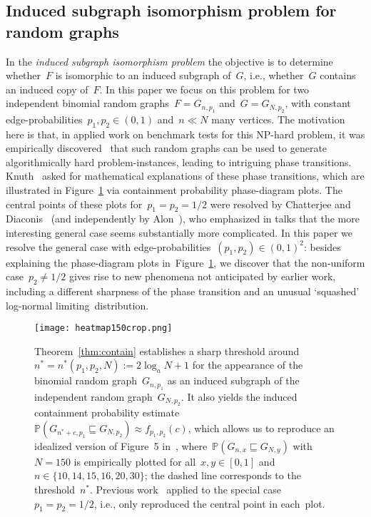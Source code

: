 \documentclass{article}
\renewcommand{\Pr}{\mathbb{P}}
\newcommand{\isub}{\sqsubseteq}
\begin{document}
\subsection{Induced subgraph isomorphism problem for random graphs}\label{sec:intro:contain}
In the \emph{induced subgraph isomorphism problem} the objective is to determine whether~$F$ is isomorphic to an induced subgraph of~$G$, 
i.e., whether~$G$ contains an induced copy of~$F$. 
In this paper we focus on this problem for two independent binomial random graphs~$F=G_{n,p_1}$ and~$G=G_{N,p_2}$, 
with constant edge-probabilities~${p_1,p_2 \in (0,1)}$ and~${n \ll N}$ many vertices. 
The motivation here is that, in applied work on benchmark tests for this NP-hard problem, it was empirically discovered~\cite{mccreesh2016subgraph,mccreesh2018subgraph} that such random graphs can be used to generate algorithmically hard problem-instances, 
leading to intriguing phase transitions. Knuth~\cite{SJPC,chatterjee2021isomorphisms} asked for mathematical explanations of these phase transitions, 
which are illustrated in Figure~\ref{fig:heatmap150} via containment probability phase-diagram plots.
The central points of these plots for~$p_1=p_2=1/2$ were resolved by Chatterjee and Diaconis~\cite{chatterjee2021isomorphisms} (and independently by Alon~\cite{Alon2017,Alon2023}), 
who emphasized in talks that the more interesting general case seems substantially more complicated. 
In this paper we resolve the general case with edge-probabilities~${(p_1,p_2) \in (0,1)^2}$: 
besides explaining the phase-diagram plots in~Figure~\ref{fig:heatmap150}, 
we discover that the non-uniform case~$p_2 \neq 1/2$ gives rise to new phenomena not anticipated by earlier work, 
including a different sharpness of the phase transition and an unusual `squashed' log-normal limiting~distribution. 


\begin{figure}
    \centering
    \texttt{[image: heatmap150crop.png]}
    \caption{Theorem~\ref{thm:contain} establishes a sharp threshold around~$n^{*}=n^{*}(p_1,p_2,N):=2\log_a N + 1$ for the appearance of 
    the binomial random graph~$G_{n,p_1}$ as an induced subgraph of the independent random graph~$G_{N,p_2}$.
    It also yields the induced containment probability estimate~${\Pr(G_{n^{*}+c,p_1}\isub G_{N,p_2})\approx f_{p_1,p_2}(c)}$, which allows us to reproduce an idealized version of Figure~5 in~\cite{mccreesh2018subgraph}, where~$\Pr(G_{n,x}\isub G_{N,y})$ with~$N=150$ is empirically plotted for all~$x,y\in [0,1]$ and ${n\in \{10, 14, 15, 16, 20, 30\}}$; the dashed line corresponds to the threshold~$n^{*}$.
		Previous work~\cite{chatterjee2021isomorphisms} applied to the special case~$p_1=p_2=1/2$, i.e., only reproduced the central point in each~plot.\label{fig:heatmap150}}
\end{figure}
\end{document}
